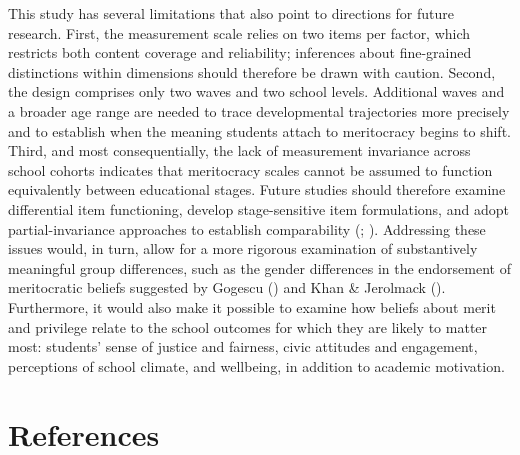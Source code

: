 \documentclass[
  13pt,
]{article}
\begin{document}
This study has several limitations that also point to directions for
future research. First, the measurement scale relies on two items per
factor, which restricts both content coverage and reliability;
inferences about fine-grained distinctions within dimensions should
therefore be drawn with caution. Second, the design comprises only two
waves and two school levels. Additional waves and a broader age range
are needed to trace developmental trajectories more precisely and to
establish when the meaning students attach to meritocracy begins to
shift. Third, and most consequentially, the lack of measurement
invariance across school cohorts indicates that meritocracy scales
cannot be assumed to function equivalently between educational stages.
Future studies should therefore examine differential item functioning,
develop stage-sensitive item formulations, and adopt partial-invariance
approaches to establish comparability
(;
).
Addressing these issues would, in turn, allow for a more rigorous
examination of substantively meaningful group differences, such as the
gender differences in the endorsement of meritocratic beliefs suggested
by Gogescu () and Khan \&
Jerolmack (). Furthermore, it would
also make it possible to examine how beliefs about merit and privilege
relate to the school outcomes for which they are likely to matter most:
students' sense of justice and fairness, civic attitudes and engagement,
perceptions of school climate, and wellbeing, in addition to academic
motivation.

\section{References}\label{references}
\end{document}
